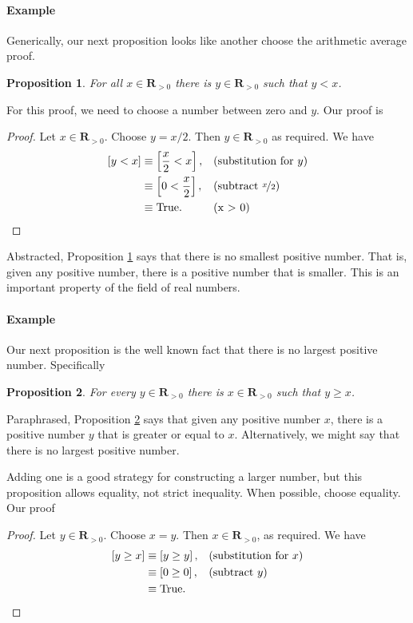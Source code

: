 \documentclass[12pt,fleqn]{article}
\newcommand{\reals}{\mathbf{R}}
\newcommand{\true}{\mathrm{True}}
\newenvironment{myproof}
  {\begin{shaded}\begin{proof}}
  {\end{proof}\end{shaded}}
\newtheorem{prop}{Proposition}
\newcounter{ex}\setcounter{ex}{0}
\newcommand{\ex}{%
\setcounter{ex}{\value{ex}+1}
\paragraph{Example \theex}}
\begin{document}
 \ex   Generically, our next proposition looks like another choose 
 the arithmetic average proof. 
      
    \begin{prop}   For all $x \in \reals_{>0}$ there is 
      $y \in \reals_{> 0}$ such that $y < x$.  \label{p5}
    \end{prop}
   
    For this proof,  we need to choose a  number between  zero and $y$. Our proof is
      \begin{myproof}  Let $x \in \reals_{>0}$. Choose $y = x/2$. Then $y \in \reals_{>0}$ as required. We have
         \begin{align*}
         \left[y < x \right] &\equiv \left[\frac{x}{2} < x \right], &&\text{(substitution for $y$)} \\
                                   &\equiv \left[0 < \frac{x}{2}  \right], &&\text{(subtract $\nicefrac{x}{2}$)} \\
                                   &\equiv \true.  &&\text{(x > 0)} \qedhere
      \end{align*}
      \end{myproof}
Abstracted, Proposition \ref{p5} says that there is no smallest positive number. That is, given any positive number, there is a 
positive number that is smaller.  This is an important property of the field of real numbers.
       
\ex Our next proposition is the well known fact that there is
no largest positive number. Specifically
       \begin{prop} For every $y \in \reals_{> 0}$ there is  
        $x \in \reals_{>0}$ such that $y \geq  x$. \label{p6}
      \end{prop}
      Paraphrased, Proposition \ref{p6} says that given any positive number $x$, there is a positive number $y$ that is greater or equal to $x$. Alternatively, we
      might say that there is no largest positive number. 
      
      Adding one is a good strategy for constructing a larger number, but this proposition
      allows equality, not strict inequality.  When possible, choose equality. Our proof
      
       \begin{myproof} Let $y \in \reals_{>0}$. Choose $x = y$. Then $x \in \reals_{>0}$, as 
        required. We have
       \begin{align*}
         \left[y \geq x  \right] &\equiv \left[y \geq  y \right], && \text{(substitution for $x$)} \\
                                      &\equiv \left[0 \geq 0 \right], &&\text{(subtract $y$)} \\
                                      &\equiv \true. && \qedhere
       \end{align*}
       
       \end{myproof}
\end{document}

